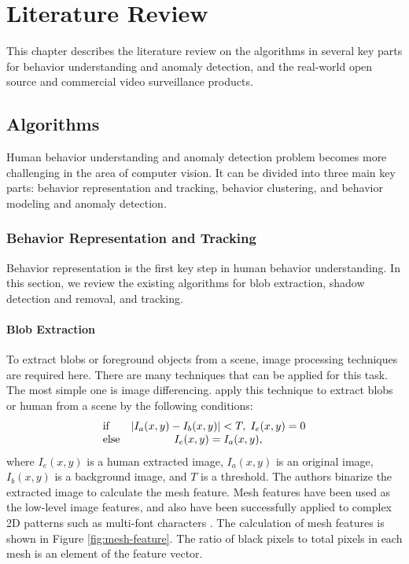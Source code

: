 \setlength{\footskip}{8mm}

\chapter{Literature Review} 
\label{ch:literature-review}

This chapter describes the literature review on the algorithms in
several key parts for behavior understanding and anomaly detection,
and the real-world open source and commercial video surveillance
products.

\section{Algorithms}

Human behavior understanding and anomaly detection problem becomes
more challenging in the area of computer vision. It can be divided
into three main key parts: behavior representation and tracking,
behavior clustering, and behavior modeling and anomaly detection.


\subsection{Behavior Representation and Tracking}

Behavior representation is the first key step in human behavior
understanding. In this section, we review the existing algorithms 
for blob extraction, shadow detection and removal, and tracking.

\subsubsection{Blob Extraction}
\label{literature-review-blob-extraction}

To extract blobs or foreground objects from a scene, image processing
techniques are required here. There are many techniques that can be
applied for this task. The most simple one is image
differencing.  apply this technique to extract
blobs or human from a scene by the following conditions:
\[
\begin{array}{lc}
  {\rm if} & \left|{I_a (x,y) - I_b (x,y)}\right|< T,\;I_e (x,y) = 0 \\ 
  {\rm else} & I_e (x,y) = I_a (x,y), 
\end{array}
\]
where $I_e (x,y)$ is a human extracted image, $I_a (x,y)$ is an
original image, $I_b (x,y)$ is a background image, and $T$ is a
threshold. The authors binarize the extracted image to calculate the
mesh feature. Mesh features have been used as the low-level image
features, and also have been successfully applied to complex 2D
patterns such as multi-font characters . The
calculation of mesh features is shown in Figure
\ref{fig:mesh-feature}. The ratio of black pixels to total pixels in
each mesh is an element of the feature vector.

